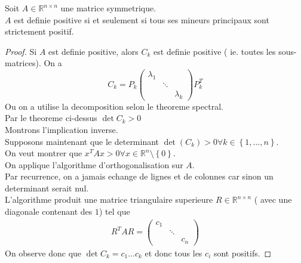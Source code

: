 \documentclass[../main.tex]{subfiles}
\begin{document}
\begin{thm}
Soit $A \in \mathbb{R}^{n\times n}$ une matrice symmetrique.\\
$A$ est definie positive si et seulement si tous ses mineurs principaux sont strictement positif.
\end{thm}
\begin{proof}
	Si $A$ est definie positive, alors $C_{k} $ est definie positive ( ie. toutes les sous-matrices). On a
	\[ 
	C_k = P_k 
\begin{pmatrix}
	\lambda_1 & &\\
		  & \ddots &\\
		  & & \lambda_k
\end{pmatrix}
P_k^{T}
	\]
	Ou on a utilise la decomposition selon le theoreme spectral.\\
	Par le theoreme ci-dessus $\det C_k >0$ \\
Montrons l'implication inverse.\\
Supposons maintenant que le determinant $\det( C_k) >0\forall k \in \left\{ 1,\ldots, n \right\} $.\\
On veut montrer que $x^{T}Ax>0\forall x\in \mathbb{R}^{n}\setminus \left\{ 0 \right\} $.\\
On applique l'algorithme d'orthogonalisation sur $A$.\\
Par recurrence, on a jamais echange de lignes et de colonnes car sinon un determinant serait nul.\\
L'algorithme produit une matrice triangulaire superieure $R \in \mathbb{R}^{n\times n}$ ( avec une diagonale contenant des $1$) tel que
\begin{align*}
R^{T}A R = 
\begin{pmatrix}
	c_1 & &\\
		  & \ddots &\\
		  & & c_n
\end{pmatrix}
\end{align*}
On observe donc que $\det C_k = c_1\ldots c_k$ et donc tous les $c_i$ sont positifs.
 
	
\end{proof}
\end{document}
